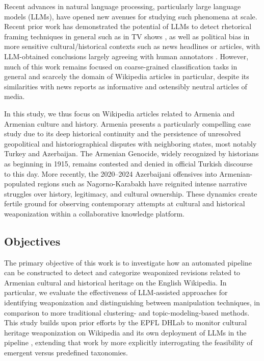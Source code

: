\documentclass[11pt, a4paper, twoside, openright]{article} %
\begin{document}
Recent advances in natural language processing, particularly large language models (LLMs), have opened new avenues for studying such phenomena at scale. Recent prior work has demonstrated the potential of LLMs to detect rhetorical framing techniques in general such as in TV shows \cite{Alonso_del_Barrio_2024}, as well as political bias in more sensitive cultural/historical contexts such as news headlines or articles, with LLM-obtained conclusions largely agreeing with human annotators \cite{banik2025bridginghumanmodelperspectives}\cite{pastorino2024decodingnewsnarrativescritical}. However, much of this work remains focused on coarse-grained classification tasks in general and scarcely the domain of Wikipedia articles in particular, despite its similarities with news reports as informative and ostensibly neutral articles of media.

In this study, we thus focus on Wikipedia articles related to Armenia and Armenian culture and history. Armenia presents a particularly compelling case study due to its deep historical continuity and the persistence of unresolved geopolitical and historiographical disputes with neighboring states, most notably Turkey and Azerbaijan. The Armenian Genocide, widely recognized by historians as beginning in 1915, remains contested and denied in official Turkish discourse to this day. More recently, the 2020–2024 Azerbaijani offensives into Armenian-populated regions such as Nagorno-Karabakh have reignited intense narrative struggles over history, legitimacy, and cultural ownership. These dynamics create fertile ground for observing contemporary attempts at cultural and historical weaponization within a collaborative knowledge platform.

\subsection{Objectives}

The primary objective of this work is to investigate how an automated pipeline can be constructed to detect and categorize weaponized revisions related to Armenian cultural and historical heritage on the English Wikipedia. In particular, we evaluate the effectiveness of LLM-assisted approaches for identifying weaponization and distinguishing between manipulation techniques, in comparison to more traditional clustering- and topic-modeling-based methods. This study builds upon prior efforts by the EPFL DHLab to monitor cultural heritage weaponization on Wikipedia and its own deployment of LLMs in the pipeline \cite{hidri2025weaponization}, extending that work by more explicitly interrogating the feasibility of emergent versus predefined taxonomies.
\end{document}
